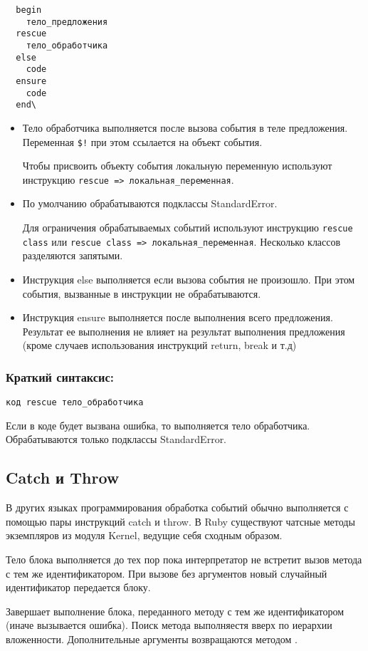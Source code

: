 \begin{verbatim}
  begin 
    тело_предложения
  rescue 
    тело_обработчика 
  else 
    code 
  ensure 
    code 
  end\
\end{verbatim}

\begin{itemize}
  \item Тело обработчика выполняется после вызова события в теле предложения. Переменная \verb/$!/ при этом ссылается на объект события.
 
  Чтобы присвоить объекту события локальную переменную используют инструкцию \verb!rescue => локальная_переменная!.

  \item По умолчанию обрабатываются подклассы StandardError.

  Для ограничения обрабатываемых событий используют инструкцию \verb!rescue class! или \verb!rescue class => локальная_переменная!. Несколько классов разделяются запятыми.

  \item Инструкция else выполняется если вызова события не произошло. При этом события, вызванные в инструкции не обрабатываются.

  \item Инструкция ensure выполняется после выполнения всего предложения. Результат ее выполнения не влияет на результат выполнения предложения (кроме случаев использования инструкций return, break и т.д)
\end{itemize}

\subsubsection*{Краткий синтаксис:}

\verb!код rescue тело_обработчика!

Если в коде будет вызвана ошибка, то выполняется тело обработчика. Обрабатываются только подклассы StandardError. 

\subsection{Catch и Throw}

В других языках программирования обработка событий обычно выполняется с помощью пары инструкций catch и throw. В Ruby существуют чатсные методы экземпляров из модуля Kernel, ведущие себя сходным образом.

\begin{methodlist}
  Тело блока выполняется до тех пор пока интерпретатор не встретит вызов метода  с тем же идентификатором. При вызове без аргументов новый случайный идентификатор передается блоку.

  Завершает выполнение блока, переданного методу  с тем же идентификатором (иначе вызывается ошибка). Поиск метода выполняестя вверх по иерархии вложенности. Дополнительные аргументы возвращаются методом .
\end{methodlist}